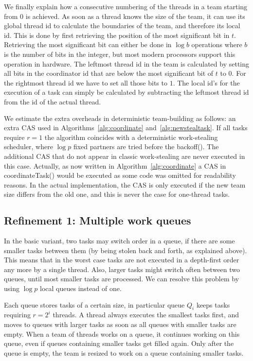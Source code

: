 \documentclass[preprint]{sigplanconf}
\begin{document}
We finally explain how a consecutive numbering of the threads in a
team starting from 0 is achieved.  As soon as a thread knows the size
of the team, it can use its global thread id to calculate the
boundaries of the team, and therefore its local id. This is done by
first retrieving the position of the most significant bit in
$t$. Retrieving the most significant bit can either be done in $\log
b$ operations where $b$ is the number of bits in the integer, but most
modern processors support this operation in hardware. The leftmost
thread id in the team is calculated by setting all bits in the
coordinator id that are below the most significant bit of $t$ to
$0$. For the rightmost thread id we have to set all those bits to
$1$. The local id's for the execution of a task can simply be
calculated by subtracting the leftmost thread id from the id of the
actual thread.

We estimate the extra overheads in deterministic team-building as
follows: an extra CAS used in Algorithms~\ref{alg:coordinate}
and~\ref{alg:newstealtask}. If all tasks require $r=1$ the algorithm
coincides with a deterministic work-stealing scheduler, where $\log p$
fixed partners are tried before the backoff(). The additional CAS that
do not appear in classic work-stealing are never executed in this
case. Actually, as now written in Algorithm~\ref{alg:coordinate} a CAS
in coordinateTask() would be executed as some code was omitted for
readability reasons. In the actual implementation, the CAS is only
executed if the new team size differs from the old one, and this is
never the case for one-thread tasks.

\subsection{Refinement 1: Multiple work queues}

In the basic variant, two tasks may switch order in a queue, if there
are some smaller tasks between them (by being stolen back and forth,
as explained above). This means that in the worst case tasks are not
executed in a depth-first order any more by a single thread. Also,
larger tasks might switch often between two queues, until most smaller
tasks are processed. We can resolve this problem by using $\log p$
local queues instead of one.

Each queue stores tasks of a certain size, in particular queue $Q_i$
keeps tasks requiring $r=2^i$ threads. A thread always executes the
smallest tasks first, and moves to queues with larger tasks as soon as
all queues with smaller tasks are empty. When a team of threads works
on a queue, it continues working on this queue, even if queues
containing smaller tasks get filled again. Only after the queue is
empty, the team is resized to work on a queue containing smaller
tasks.
\end{document}
